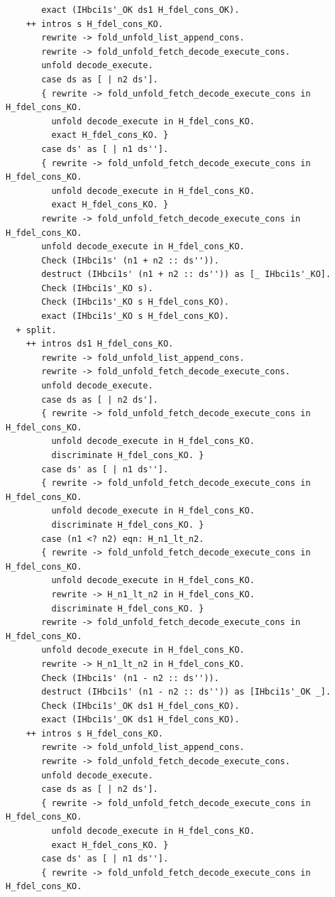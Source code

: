 \documentclass{article}
\begin{document}
\begin{lstlisting}
       exact (IHbci1s'_OK ds1 H_fdel_cons_OK).
    ++ intros s H_fdel_cons_KO.
       rewrite -> fold_unfold_list_append_cons.
       rewrite -> fold_unfold_fetch_decode_execute_cons.
       unfold decode_execute.
       case ds as [ | n2 ds'].
       { rewrite -> fold_unfold_fetch_decode_execute_cons in H_fdel_cons_KO.
         unfold decode_execute in H_fdel_cons_KO.
         exact H_fdel_cons_KO. }
       case ds' as [ | n1 ds''].
       { rewrite -> fold_unfold_fetch_decode_execute_cons in H_fdel_cons_KO.
         unfold decode_execute in H_fdel_cons_KO.
         exact H_fdel_cons_KO. }
       rewrite -> fold_unfold_fetch_decode_execute_cons in H_fdel_cons_KO.
       unfold decode_execute in H_fdel_cons_KO.
       Check (IHbci1s' (n1 + n2 :: ds'')).
       destruct (IHbci1s' (n1 + n2 :: ds'')) as [_ IHbci1s'_KO].
       Check (IHbci1s'_KO s).
       Check (IHbci1s'_KO s H_fdel_cons_KO).
       exact (IHbci1s'_KO s H_fdel_cons_KO).
  + split.
    ++ intros ds1 H_fdel_cons_KO.
       rewrite -> fold_unfold_list_append_cons.
       rewrite -> fold_unfold_fetch_decode_execute_cons.
       unfold decode_execute.
       case ds as [ | n2 ds'].
       { rewrite -> fold_unfold_fetch_decode_execute_cons in H_fdel_cons_KO.
         unfold decode_execute in H_fdel_cons_KO.
         discriminate H_fdel_cons_KO. }
       case ds' as [ | n1 ds''].
       { rewrite -> fold_unfold_fetch_decode_execute_cons in H_fdel_cons_KO.
         unfold decode_execute in H_fdel_cons_KO.
         discriminate H_fdel_cons_KO. }
       case (n1 <? n2) eqn: H_n1_lt_n2.
       { rewrite -> fold_unfold_fetch_decode_execute_cons in H_fdel_cons_KO.
         unfold decode_execute in H_fdel_cons_KO.
         rewrite -> H_n1_lt_n2 in H_fdel_cons_KO.
         discriminate H_fdel_cons_KO. }
       rewrite -> fold_unfold_fetch_decode_execute_cons in H_fdel_cons_KO.
       unfold decode_execute in H_fdel_cons_KO.
       rewrite -> H_n1_lt_n2 in H_fdel_cons_KO.
       Check (IHbci1s' (n1 - n2 :: ds'')).
       destruct (IHbci1s' (n1 - n2 :: ds'')) as [IHbci1s'_OK _].
       Check (IHbci1s'_OK ds1 H_fdel_cons_KO).
       exact (IHbci1s'_OK ds1 H_fdel_cons_KO).
    ++ intros s H_fdel_cons_KO.
       rewrite -> fold_unfold_list_append_cons.
       rewrite -> fold_unfold_fetch_decode_execute_cons.
       unfold decode_execute.
       case ds as [ | n2 ds'].
       { rewrite -> fold_unfold_fetch_decode_execute_cons in H_fdel_cons_KO.
         unfold decode_execute in H_fdel_cons_KO.
         exact H_fdel_cons_KO. }
       case ds' as [ | n1 ds''].
       { rewrite -> fold_unfold_fetch_decode_execute_cons in H_fdel_cons_KO.

\end{lstlisting}
\end{document}
